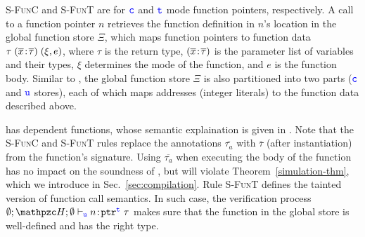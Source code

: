 {\textsc{S-FunC} and \textsc{S-FunT} are
for $\textcolor{blue}{\texttt{c}}$ and $\textcolor{blue}{\texttt{t}}$ mode function pointers, respectively. 
A call to a function pointer $n$ retrieves
 the function definition in $n$'s location in the global function store $\Xi$,
which maps function pointers to
function data $\tau\;({\overline{x}}\!:\!{\overline{\tau}})\;(\xi,e)$, where
$\tau$ is the return type, $({\overline{x}}\!:\!{\overline{\tau}})$
is the parameter list of variables and their types, 
$\xi$ determines the mode of the function, and $e$ is the
function body. 
Similar to \heap, the global function store $\Xi$ is also partitioned into
two parts ($\textcolor{blue}{\texttt{c}}$ and $\textcolor{blue}{\texttt{u}}$ stores), each of which
maps addresses (integer literals) to the function data described above.

\systemname{} has dependent functions, whose semantic explaination is given in .
Note that the \textsc{S-FunC} and \textsc{S-FunT} rules replace the
  annotations $\overline{\tau_a}$ with
  $\overline{\tau}$ (after instantiation) from the function's
  signature. Using $\overline{\tau_a}$ when executing the body of
the function has no impact on the soundness of \lang, but will violate
Theorem~\ref{simulation-thm}, which we introduce in Sec.~\ref{sec:compilation}.
Rule \textsc{S-FunT} defines the tainted version of function call semantics.
In such case, the verification process 
$\emptyset;\heap ; \emptyset \vdash_{\umode}\evalue{n}{\tptr{\tau}{\tmode}}$
makes sure that the function in the global store is well-defined and has the right type.




}
